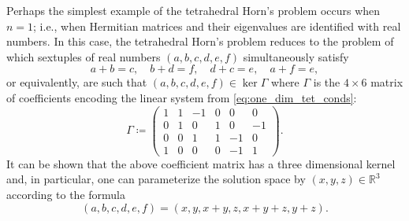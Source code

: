 \documentclass[notitlepage, 10pt]{article}
\begin{document}
\begin{exam}[Tetrahedral Horn's problem for \texorpdfstring{$n=1$}{n=1}]
    \label{exam:one_dim_soln}
    Perhaps the simplest example of the tetrahedral Horn's problem occurs when $n=1$; i.e., when Hermitian matrices and their eigenvalues are identified with real numbers.
    In this case, the tetrahedral Horn's problem reduces to the problem of which sextuples of real numbers $(a,b,c,d,e,f)$ simultaneously satisfy
    \begin{equation}
        \label{eq:one_dim_tet_conds}
        a + b = c, \quad
        b + d = f, \quad
        d + c = e, \quad
        a + f = e,
    \end{equation}
    or equivalently, are such that $(a,b,c,d,e,f) \in \ker \Gamma$ where $\Gamma$ is the $4 \times 6$ matrix of coefficients encoding the linear system from \cref{eq:one_dim_tet_conds}:
    \begin{equation}
        \label{eq:tet_coeff_matrix}
        \Gamma \coloneqq
        \begin{pmatrix} 
            1 & 1 & -1 & 0 & 0 & 0 \\
            0 & 1 & 0 & 1 & 0 & -1 \\
            0 & 0 & 1 & 1 & -1 & 0 \\
            1 & 0 & 0 & 0 & -1 & 1 
        \end{pmatrix}.
    \end{equation}
    It can be shown that the above coefficient matrix has a three dimensional kernel and, in particular, one can parameterize the solution space by $(x,y,z) \in \mathbb R^{3}$ according to the formula
    \begin{equation}
        \label{eq:one_dim_soln}
        (a,b,c,d,e,f) = (x, y, x+y, z, x+y+z, y+z).
    \end{equation}
\end{exam}
\end{document}
